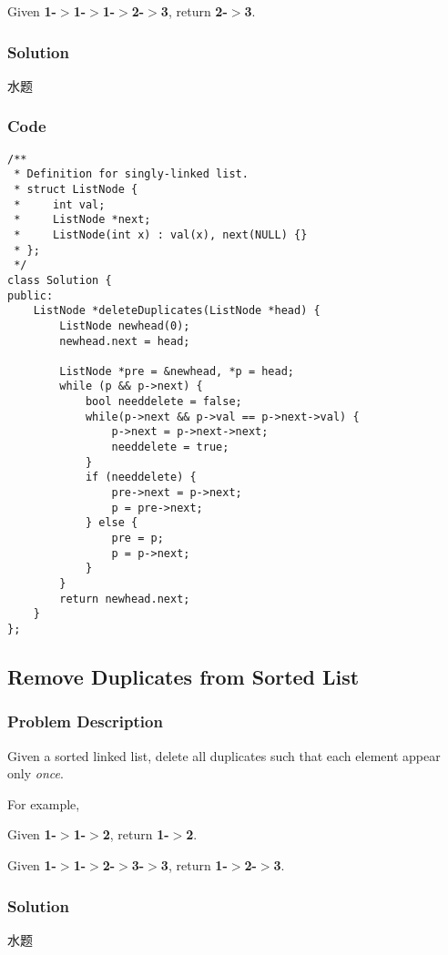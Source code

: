 \documentclass[courier]{article}
\begin{document}
\begin{CJK*}{UTF8}{gkai}
Given \textbf{1-$>$1-$>$1-$>$2-$>$3}, return \textbf{2-$>$3}.



\subsubsection*{Solution}
水题

\subsubsection*{Code}
\begin{lstlisting}
/**
 * Definition for singly-linked list.
 * struct ListNode {
 *     int val;
 *     ListNode *next;
 *     ListNode(int x) : val(x), next(NULL) {}
 * };
 */
class Solution {
public:
    ListNode *deleteDuplicates(ListNode *head) {
        ListNode newhead(0);
        newhead.next = head;
        
        ListNode *pre = &newhead, *p = head;
        while (p && p->next) {
            bool needdelete = false;
            while(p->next && p->val == p->next->val) {
                p->next = p->next->next;
                needdelete = true;
            }
            if (needdelete) {
                pre->next = p->next;
                p = pre->next;
            } else {
                pre = p;
                p = p->next;
            }
        }
        return newhead.next;
    }
}; 
\end{lstlisting}


\subsection{ Remove Duplicates from Sorted List }

\subsubsection*{Problem Description}
Given a sorted linked list, delete all duplicates such that each element appear only \emph{once}.

For example,


Given \textbf{1-$>$1-$>$2}, return \textbf{1-$>$2}.


Given \textbf{1-$>$1-$>$2-$>$3-$>$3}, return \textbf{1-$>$2-$>$3}.



\subsubsection*{Solution}
水题


\end{CJK*}
\end{document}
